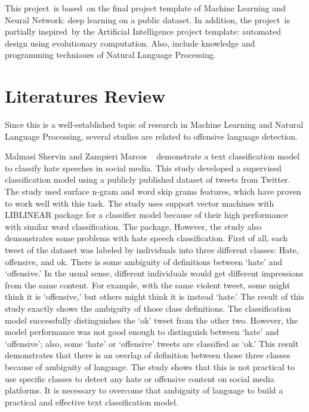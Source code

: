 \documentclass[11pt, natbib=false]{article}
\begin{document}
\begin{multicols}{2}
This project is based on the final project template of Machine Learning and Neural Network: deep learning on a public dataset.
In addition, the project is partially inspired by the Artificial Intelligence project template: automated design using evolutionary computation.
Also, include knowledge and programming techniaues of Natural Language Processing. 

\section{Literatures Review}
Since this is a well-established topic of research in Machine Learning and Natural Language Processing, several studies are related to offensive language detection. 

Malmasi Shervin and Zampieri Marcos ~\cite{malmasi2017detecting} demonstrate a text classification model to classify hate speeches in social media. This study developed a supervised classification model using a publicly published dataset of tweets from Twitter.
The study used surface n-gram and word skip grams features, which have proven to work well with this task. The study uses support vector machines with LIBLINEAR package for a classifier model because of their high performance with similar word classification.
The package, However, the study also demonstrates some problems with hate speech classification. First of all, each tweet of the dataset was labeled by individuals into three different classes: Hate, offensive, and ok.
There is some ambiguity of definitions between ‘hate’ and ‘offensive.’ In the usual sense, different individuals would get different impressions from the same content.
For example, with the same violent tweet, some might think it is ‘offensive,’ but others might think it is instead ‘hate.’
The result of this study exactly shows the ambiguity of those class definitions. The classification model successfully distinguishes the ‘ok’ tweet from the other two. However, the model performance was not good enough to distinguish between ‘hate’ and ‘offensive’; also, some ‘hate’ or ‘offensive’ tweets are classified as ‘ok.’
This result demonstrates that there is an overlap of definition between those three classes because of ambiguity of language.
The study shows that this is not practical to use specific classes to detect any hate or offensive content on social media platforms.
It is necessary to overcome that ambiguity of language to build a practical and effective text classification model. 


\end{multicols}
\end{document}
